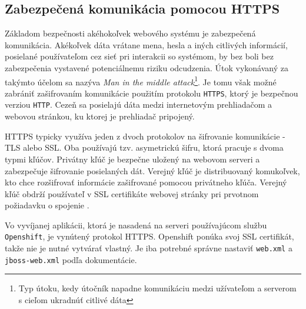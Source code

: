 \documentclass[12pt,oneside]{fithesis2}
\begin{document}
		\subsection{Zabezpečená komunikácia pomocou HTTPS} \label{https}
      		\par Základom bezpečnosti akéhokoľvek webového systému je zabezpečená komunikácia. Akékoľvek dáta vrátane mena, hesla a iných citlivých informácií, posielané používateľom cez sieť pri interakcii so systémom, by bez boli bez zabezpečenia vystavené potenciálnemu riziku odcudzenia. Útok vykonávaný za takýmto účelom sa nazýva \textit{Man in the middle attack}\footnote{Typ útoku, kedy útočník napadne komunikáciu medzi užívateľom a serverom s cieľom ukradnúť citlivé dáta}. Je tomu však možné zabrániť zašifrovaním komunikácie použitím protokolu \texttt{HTTPS}, ktorý je bezpečnou verziou \texttt{HTTP}. Cezeň sa posielajú dáta medzi internetovým prehliadačom a webovou stránkou, ku ktorej je prehliadač pripojený. 
      		\par HTTPS typicky využíva jeden z dvoch protokolov na šifrovanie komunikácie - TLS alebo SSL. Oba používajú tzv. asymetrickú šifru, ktorá pracuje s dvoma typmi kľúčov. Privátny kľúč je bezpečne uložený na webovom serveri a zabezpečuje šifrovanie posielaných dát. Verejný kľúč je distribuovaný komukoľvek, kto chce rozšifrovať informácie zašifrované pomocou privátneho kľúča. Verejný kľúč obdrží používateľ v SSL certifikáte webovej stránky pri prvotnom požiadavku o spojenie \cite{comodo15}.
      		\par Vo vyvíjanej aplikácii, ktorá je nasadená na serveri používajúcom službu \texttt{Openshift}, je vynútený protokol HTTPS. Openshift ponúka svoj SSL certifikát, takže nie je nutné vytvárať vlastný. Je iba potrebné správne nastaviť \texttt{web.xml} a \texttt{jboss-web.xml} podľa dokumentácie\cite{openshift15}.
      		
\end{document}
